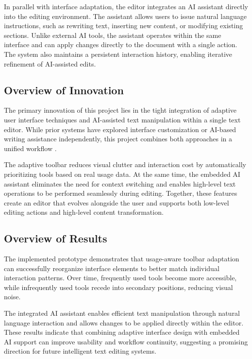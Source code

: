 \documentclass[sigconf]{acmart}
\begin{document}
In parallel with interface adaptation, the editor integrates an AI assistant directly into the editing environment. The assistant allows users to issue natural language instructions, such as rewriting text, inserting new content, or modifying existing sections. Unlike external AI tools, the assistant operates within the same interface and can apply changes directly to the document with a single action. The system also maintains a persistent interaction history, enabling iterative refinement of AI-assisted edits.

\subsection{Overview of Innovation}

The primary innovation of this project lies in the tight integration of adaptive user interface techniques and AI-assisted text manipulation within a single text editor. While prior systems have explored interface customization or AI-based writing assistance independently, this project combines both approaches in a unified workflow \cite{Bieniek2024_GenAI_UX}.

The adaptive toolbar reduces visual clutter and interaction cost by automatically prioritizing tools based on real usage data. At the same time, the embedded AI assistant eliminates the need for context switching and enables high-level text operations to be performed seamlessly during editing. Together, these features create an editor that evolves alongside the user and supports both low-level editing actions and high-level content transformation.

\subsection{Overview of Results}

The implemented prototype demonstrates that usage-aware toolbar adaptation can successfully reorganize interface elements to better match individual interaction patterns. Over time, frequently used tools become more accessible, while infrequently used tools recede into secondary positions, reducing visual noise.

The integrated AI assistant enables efficient text manipulation through natural language interaction and allows changes to be applied directly within the editor. These results indicate that combining adaptive interface design with embedded AI support can improve usability and workflow continuity, suggesting a promising direction for future intelligent text editing systems.
\end{document}
